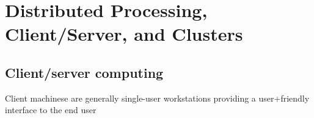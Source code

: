 \chapter{Distributed Processing,
Client/Server, and
Clusters}

\section{Client/server computing}

Client machinese are generally single-user workstations providing a user+friendly interface to the end user